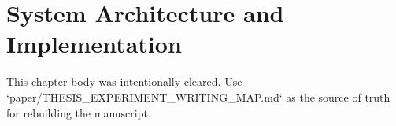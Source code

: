\chapter{System Architecture and Implementation}
\label{ch:architecture}

This chapter body was intentionally cleared. Use `paper/THESIS_EXPERIMENT_WRITING_MAP.md` as the source of truth for rebuilding the manuscript.
